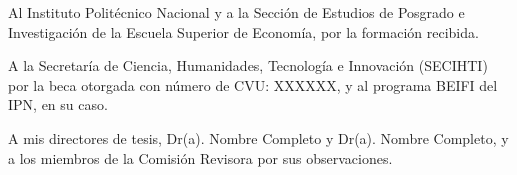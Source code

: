 Al Instituto Politécnico Nacional y a la Sección de Estudios de Posgrado e Investigación de la Escuela Superior de Economía, por la formación recibida.

A la Secretaría de Ciencia, Humanidades, Tecnología e Innovación (SECIHTI) por la beca otorgada con número de CVU: XXXXXX, y al programa BEIFI del IPN, en su caso.

A mis directores de tesis, Dr(a). Nombre Completo y Dr(a). Nombre Completo, y a los miembros de la Comisión Revisora por sus observaciones.
